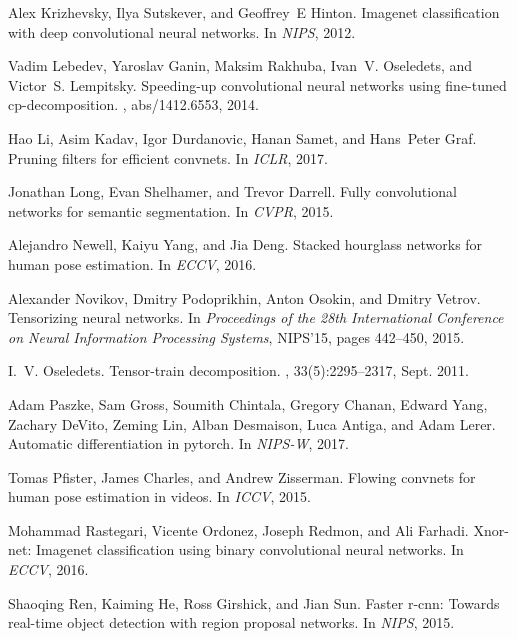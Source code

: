 \documentclass[10pt,twocolumn,letterpaper]{article}
\begin{document}
{\begin{thebibliography}{10}
Alex Krizhevsky, Ilya Sutskever, and Geoffrey~E Hinton.
\newblock Imagenet classification with deep convolutional neural networks.
\newblock In {\em NIPS}, 2012.

Vadim Lebedev, Yaroslav Ganin, Maksim Rakhuba, Ivan~V. Oseledets, and Victor~S.
  Lempitsky.
\newblock Speeding-up convolutional neural networks using fine-tuned
  cp-decomposition.
, abs/1412.6553, 2014.

Hao Li, Asim Kadav, Igor Durdanovic, Hanan Samet, and Hans~Peter Graf.
\newblock Pruning filters for efficient convnets.
\newblock In {\em ICLR}, 2017.

Jonathan Long, Evan Shelhamer, and Trevor Darrell.
\newblock Fully convolutional networks for semantic segmentation.
\newblock In {\em CVPR}, 2015.

Alejandro Newell, Kaiyu Yang, and Jia Deng.
\newblock Stacked hourglass networks for human pose estimation.
\newblock In {\em ECCV}, 2016.

Alexander Novikov, Dmitry Podoprikhin, Anton Osokin, and Dmitry Vetrov.
\newblock Tensorizing neural networks.
\newblock In {\em Proceedings of the 28th International Conference on Neural
  Information Processing Systems}, NIPS'15, pages 442--450, 2015.

I.~V. Oseledets.
\newblock Tensor-train decomposition.
, 33(5):2295--2317, Sept. 2011.

Adam Paszke, Sam Gross, Soumith Chintala, Gregory Chanan, Edward Yang, Zachary
  DeVito, Zeming Lin, Alban Desmaison, Luca Antiga, and Adam Lerer.
\newblock Automatic differentiation in pytorch.
\newblock In {\em NIPS-W}, 2017.

Tomas Pfister, James Charles, and Andrew Zisserman.
\newblock Flowing convnets for human pose estimation in videos.
\newblock In {\em ICCV}, 2015.

Mohammad Rastegari, Vicente Ordonez, Joseph Redmon, and Ali Farhadi.
\newblock Xnor-net: Imagenet classification using binary convolutional neural
  networks.
\newblock In {\em ECCV}, 2016.

Shaoqing Ren, Kaiming He, Ross Girshick, and Jian Sun.
\newblock Faster r-cnn: Towards real-time object detection with region proposal
  networks.
\newblock In {\em NIPS}, 2015.


\end{thebibliography}}
\end{document}
